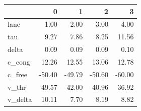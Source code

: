 \begin{tabular}{lrrrr}
\toprule
 & 0 & 1 & 2 & 3 \\
\midrule
lane & 1.00 & 2.00 & 3.00 & 4.00 \\
tau & 9.27 & 7.86 & 8.25 & 11.56 \\
delta & 0.09 & 0.09 & 0.09 & 0.10 \\
c_cong & 12.26 & 12.55 & 13.06 & 12.78 \\
c_free & -50.40 & -49.79 & -50.60 & -60.00 \\
v_thr & 49.57 & 42.00 & 40.96 & 36.92 \\
v_delta & 10.11 & 7.70 & 8.19 & 8.82 \\
\bottomrule
\end{tabular}
